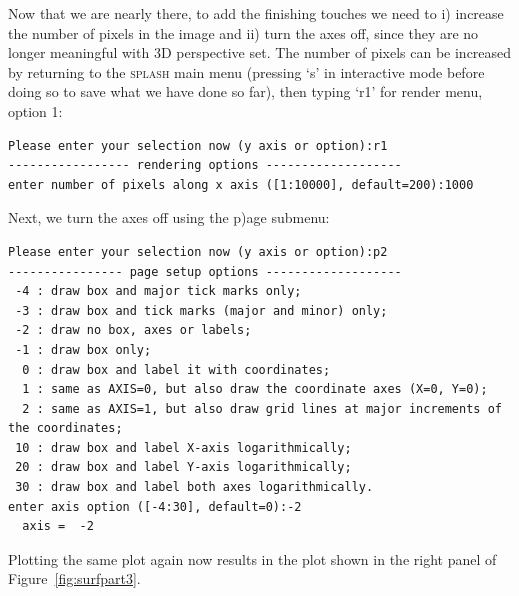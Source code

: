 \documentclass[a4paper,10pt]{article}
\newcommand{\splash}{\textsc{splash }}
\begin{document}
 Now that we are nearly there, to add the finishing touches we need to i) increase the number of pixels in the image and ii) turn the axes off, since they are no longer meaningful with 3D perspective set. The number of pixels can be increased by returning to the \splash main menu (pressing `s' in interactive mode before doing so to save what we have done so far), then typing `r1' for render menu, option 1:
\begin{verbatim}
Please enter your selection now (y axis or option):r1
----------------- rendering options -------------------
enter number of pixels along x axis ([1:10000], default=200):1000
\end{verbatim}
Next, we turn the axes off using the p)age submenu:
\begin{verbatim}
Please enter your selection now (y axis or option):p2
---------------- page setup options -------------------
 -4 : draw box and major tick marks only;
 -3 : draw box and tick marks (major and minor) only;
 -2 : draw no box, axes or labels;
 -1 : draw box only;
  0 : draw box and label it with coordinates;
  1 : same as AXIS=0, but also draw the coordinate axes (X=0, Y=0);
  2 : same as AXIS=1, but also draw grid lines at major increments of the coordinates;
 10 : draw box and label X-axis logarithmically;
 20 : draw box and label Y-axis logarithmically;
 30 : draw box and label both axes logarithmically.
enter axis option ([-4:30], default=0):-2
  axis =  -2
\end{verbatim}
 Plotting the same plot again now results in the plot shown in the right panel of Figure~\ref{fig:surfpart3}.
\end{document}
